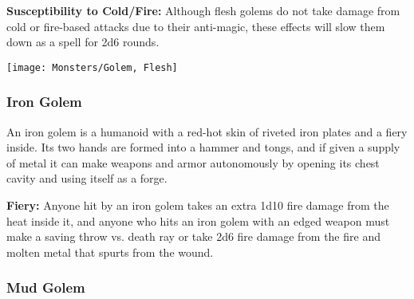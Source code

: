 \begin{multicols*}{2}
\textbf{Susceptibility to Cold/Fire:} Although flesh golems do not take damage from cold or fire-based attacks due to their anti-magic, these effects will slow them down as a  spell for 2d6 rounds.

\texttt{[image: Monsters/Golem, Flesh]}

\subsubsection{Iron Golem}

An iron golem is a humanoid with a red-hot skin of riveted iron plates and a fiery inside. Its two hands are formed into a hammer and tongs, and if given a supply of metal it can make weapons and armor autonomously by opening its chest cavity and using itself as a forge.

\textbf{Fiery:} Anyone hit by an iron golem takes an extra 1d10 fire damage from the heat inside it, and anyone who hits an iron golem with an edged weapon must make a saving throw vs. death ray or take 2d6 fire damage from the fire and molten metal that spurts from the wound.

\subsubsection{Mud Golem}
\end{multicols*}
